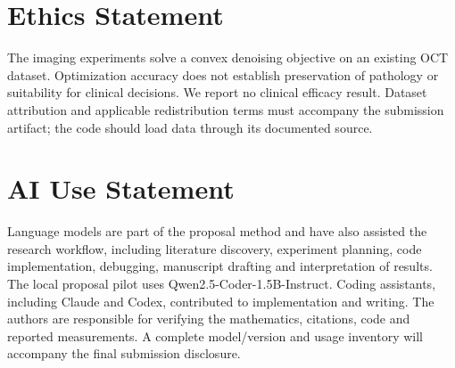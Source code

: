 \documentclass{article}
\theoremstyle{definition}
\theoremstyle{remark}
\newcommand{\deprecated}[1]{\textcolor{red}{\textbf{[DEPRECATED FOR ICLR: #1]}}}
\begin{document}
\section*{Ethics Statement}
The imaging experiments solve a convex denoising objective on an existing OCT
dataset. Optimization accuracy does not establish preservation of pathology
or suitability for clinical decisions. We report no clinical efficacy result.
Dataset attribution and applicable redistribution terms must accompany the
submission artifact; the code should load data through its documented source.

\section*{AI Use Statement}
Language models are part of the proposal method and have also assisted the
research workflow, including literature discovery, experiment planning, code
implementation, debugging, manuscript drafting and interpretation of results.
The local proposal pilot uses Qwen2.5-Coder-1.5B-Instruct. Coding assistants,
including Claude and Codex, contributed to implementation and writing.
The authors are responsible for verifying the mathematics, citations, code
and reported measurements. A complete model/version and usage inventory will
accompany the final submission disclosure.





\appendix








\newpage
% 
\end{document}
